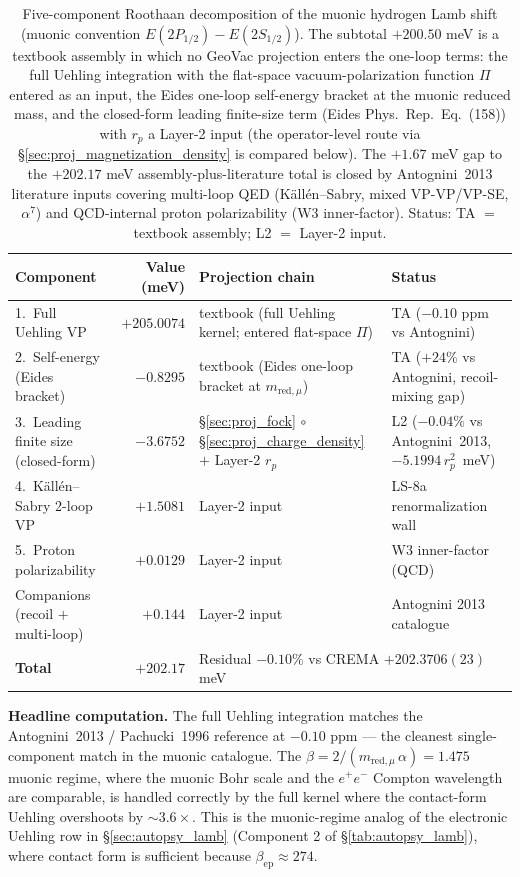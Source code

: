 \documentclass[11pt]{article}
\begin{document}
\begin{table}[h!]
\centering\small
\caption{Five-component Roothaan decomposition of the muonic hydrogen
Lamb shift (muonic convention $E(2P_{1/2}) - E(2S_{1/2})$).  The
subtotal $+200.50$ meV is a textbook assembly in which no GeoVac
projection enters the one-loop terms: the full Uehling integration with
the flat-space vacuum-polarization function $\Pi$ entered as an input,
the Eides one-loop self-energy bracket at the muonic reduced mass, and
the closed-form leading finite-size term (Eides Phys.\ Rep.\ Eq.~(158)) with $r_p$ a Layer-2
input (the operator-level route via
\S\ref{sec:proj_magnetization_density} is compared below).
The $+1.67$ meV gap to the $+202.17$ meV
assembly-plus-literature total is closed by Antognini~2013
literature inputs covering multi-loop QED (K\"all\'en--Sabry,
mixed VP-VP/VP-SE, $\alpha^7$) and QCD-internal proton
polarizability (W3 inner-factor).  Status: TA $=$ textbook assembly;
L2 $=$ Layer-2 input.}
\label{tab:autopsy_muh_lamb}
\begin{tabular}{p{4.5cm} r p{4.8cm} l}
\toprule
Component & Value (meV) & Projection chain & Status \\
\midrule
1.~Full Uehling VP & $+205.0074$ &
textbook (full Uehling kernel; entered flat-space $\Pi$)
& TA ($-0.10$ ppm vs Antognini) \\
2.~Self-energy (Eides bracket) & $-0.8295$ &
textbook (Eides one-loop bracket at $m_{\text{red},\mu}$)
& TA ($+24\%$ vs Antognini, recoil-mixing gap) \\
3.~Leading finite size (closed-form) & $-3.6752$ &
\S\ref{sec:proj_fock} $\circ$ \S\ref{sec:proj_charge_density}
$+$ Layer-2 $r_p$
& L2 ($-0.04\%$ vs Antognini~2013, $-5.1994\,r_p^2$~meV) \\
4.~K\"all\'en--Sabry 2-loop VP & $+1.5081$ & Layer-2 input &
LS-8a renormalization wall \\
5.~Proton polarizability & $+0.0129$ & Layer-2 input &
W3 inner-factor (QCD) \\
Companions (recoil $+$ multi-loop) & $+0.144$ & Layer-2 input &
Antognini 2013 catalogue \\
\midrule
\textbf{Total} & $+202.17$ & \multicolumn{2}{l}{Residual $-0.10\%$
vs CREMA $+202.3706(23)$ meV} \\
\bottomrule
\end{tabular}
\end{table}

\textbf{Headline computation.}  The full Uehling integration
matches the Antognini~2013 / Pachucki~1996 reference at $-0.10$ ppm
--- the cleanest single-component match in the muonic catalogue.
The $\beta = 2/(m_{\text{red},\mu}\,\alpha) = 1.475$ muonic regime,
where the muonic Bohr scale and the $e^+ e^-$ Compton wavelength are
comparable, is handled correctly by the full kernel where the
contact-form Uehling overshoots by $\sim 3.6\times$.  This is the
muonic-regime analog of the electronic Uehling row in
\S\ref{sec:autopsy_lamb} (Component 2 of \S\ref{tab:autopsy_lamb}),
where contact form is sufficient because $\beta_\text{ep} \approx 274$.
\end{document}
